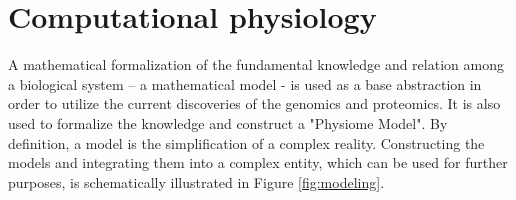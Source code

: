 %

%
%
%
\section{Computational physiology}
\label{sec:models}
A mathematical formalization of the fundamental knowledge and relation among a biological system – a mathematical model - is used as a base abstraction in order to utilize the current discoveries of the genomics and proteomics. It is also used to formalize the knowledge and construct a "Physiome Model". By  definition, a model is the simplification of a complex reality. Constructing the models and integrating them into a complex entity, which can be used for further purposes, is schematically illustrated in Figure \ref{fig:modeling}. 

